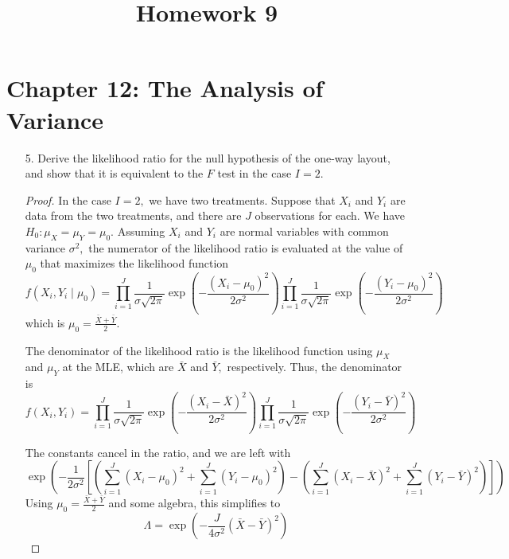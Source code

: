 \documentclass{article}
\begin{document}
\title{Homework 9}
\maketitle
\thispagestyle{fancy}

\section*{Chapter 12: The Analysis of Variance}

\begin{itemize}
	\item[5.] Derive the likelihood ratio for the null hypothesis of the one-way layout, and show that it is equivalent to the $F$ test in the case $I=2.$
		\begin{proof}
			In the case $I=2,$ we have two treatments. Suppose that $X_i$ and $Y_i$ are data from the two treatments, and there are $J$ observations for each. We have $H_0:\mu_X=\mu_Y=\mu_0.$ Assuming $X_i$ and $Y_i$ are normal variables with common variance $\sigma^2,$ the numerator of the likelihood ratio is evaluated at the value of $\mu_0$ that maximizes the likelihood function
			\[f(X_i, Y_i\mid \mu_0) = \prod_{i=1}^{J} \frac{1}{\sigma\sqrt{2\pi}}\exp\left( -\frac{(X_i-\mu_0)^2}{2\sigma^2} \right)\prod_{i=1}^{J} \frac{1}{\sigma\sqrt{2\pi}}\exp\left( -\frac{(Y_i-\mu_0)^2}{2\sigma^2} \right)\]
			which is $\mu_0=\frac{\bar X + \bar Y}{2}.$
			
			The denominator of the likelihood ratio is the likelihood function using $\mu_X$ and $\mu_Y$ at the MLE, which are $\bar X$ and $\bar Y,$ respectively. Thus, the denominator is 
			\[f(X_i, Y_i) = \prod_{i=1}^{J}\frac{1}{\sigma\sqrt{2\pi}}\exp\left( -\frac{(X_i-\bar X)^2}{2\sigma^2} \right)\prod_{i=1}^{J}\frac{1}{\sigma\sqrt{2\pi}}\exp\left( -\frac{(Y_i-\bar Y)^2}{2\sigma^2} \right)\]

			The constants cancel in the ratio, and we are left with 
			\[\exp\left( -\frac{1}{2\sigma^2}\left[ \left( \sum_{i=1}^{J}(X_i-\mu_0)^2 + \sum_{i=1}^{J}(Y_i-\mu_0)^2 \right) - \left( \sum_{i=1}^{J}(X_i-\bar X)^2 + \sum_{i=1}^{J}(Y_i-\bar Y)^2 \right) \right] \right)\]
			Using $\mu_0=\frac{\bar X+\bar Y}{2}$ and some algebra, this simplifies to
			\[\Lambda = \exp\left( -\frac{J}{4\sigma^2}(\bar X-\bar Y)^2 \right)\]


\end{proof}
\end{itemize}
\end{document}
